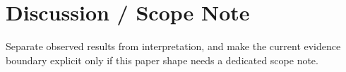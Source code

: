 \section{Discussion / Scope Note}


Separate observed results from interpretation, and make the current evidence boundary explicit only if this paper shape needs a dedicated scope note.
